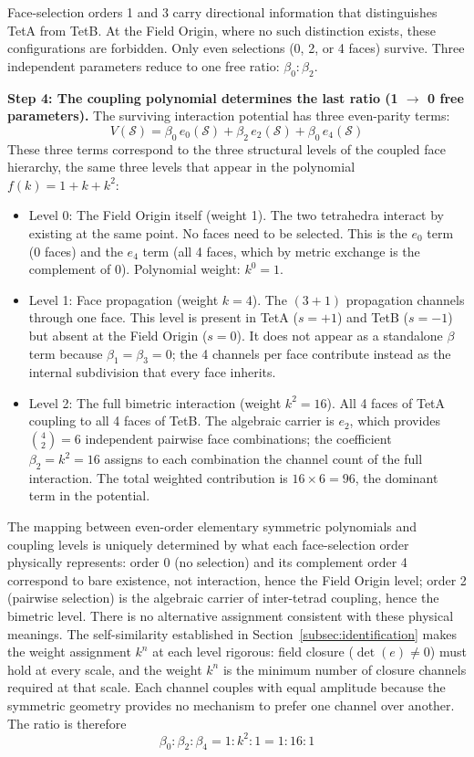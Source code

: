 \documentclass[aps,prd,preprint,superscriptaddress,showpacs,preprintnumbers,amsmath,amssymb,nofootinbib]{revtex4-2}
\begin{document}
Face-selection orders 1 and 3 carry directional information that distinguishes TetA from TetB. At the Field Origin, where no such distinction exists, these configurations are forbidden. Only even selections (0, 2, or 4 faces) survive. Three independent parameters reduce to one free ratio: $\beta_0 : \beta_2$.

\textbf{Step 4: The coupling polynomial determines the last ratio (1 $\to$ 0 free parameters).} The surviving interaction potential has three even-parity terms:
\begin{equation}
V(\mathcal{S}) = \beta_0\,e_0(\mathcal{S}) + \beta_2\,e_2(\mathcal{S}) + \beta_0\,e_4(\mathcal{S})
\end{equation}
These three terms correspond to the three structural levels of the coupled face hierarchy, the same three levels that appear in the polynomial $f(k) = 1 + k + k^2$:
\begin{itemize}
\item Level 0: The Field Origin itself (weight 1). The two tetrahedra interact by existing at the same point. No faces need to be selected. This is the $e_0$ term (0 faces) and the $e_4$ term (all 4 faces, which by metric exchange is the complement of 0). Polynomial weight: $k^0 = 1$.
\item Level 1: Face propagation (weight $k = 4$). The $(3{+}1)$ propagation channels through one face. This level is present in TetA ($s = +1$) and TetB ($s = -1$) but absent at the Field Origin ($s = 0$). It does not appear as a standalone $\beta$ term because $\beta_1 = \beta_3 = 0$; the 4 channels per face contribute instead as the internal subdivision that every face inherits.
\item Level 2: The full bimetric interaction (weight $k^2 = 16$). All 4 faces of TetA coupling to all 4 faces of TetB. The algebraic carrier is $e_2$, which provides $\binom{4}{2} = 6$ independent pairwise face combinations; the coefficient $\beta_2 = k^2 = 16$ assigns to each combination the channel count of the full interaction. The total weighted contribution is $16 \times 6 = 96$, the dominant term in the potential.
\end{itemize}

The mapping between even-order elementary symmetric polynomials and coupling levels is uniquely determined by what each face-selection order physically represents: order 0 (no selection) and its complement order 4 correspond to bare existence, not interaction, hence the Field Origin level; order 2 (pairwise selection) is the algebraic carrier of inter-tetrad coupling, hence the bimetric level. There is no alternative assignment consistent with these physical meanings. The self-similarity established in Section~\ref{subsec:identification} makes the weight assignment $k^n$ at each level rigorous: field closure ($\det(e) \neq 0$) must hold at every scale, and the weight $k^n$ is the minimum number of closure channels required at that scale. Each channel couples with equal amplitude because the symmetric geometry provides no mechanism to prefer one channel over another. The ratio is therefore
\begin{equation}
\beta_0 : \beta_2 : \beta_4 = 1 : k^2 : 1 = 1 : 16 : 1
\label{eq:beta-ratio}
\end{equation}
\end{document}
